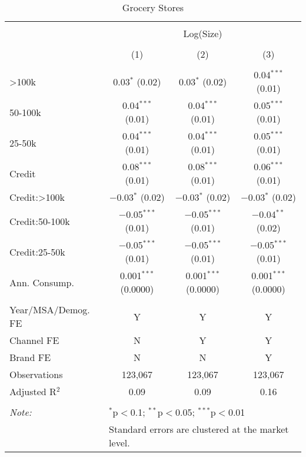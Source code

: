 
\begin{table}[!htbp] \centering 
  \caption{Grocery Stores} 
  \label{tab:packageSizeGroceryDetergent} 
\begin{tabular}{@{\extracolsep{5pt}}lccc} 
\\[-1.8ex]\hline 
\hline \\[-1.8ex] 
 & \multicolumn{3}{c}{Log(Size)} \\ 
\\[-1.8ex] & (1) & (2) & (3)\\ 
\hline \\[-1.8ex] 
 >100k & 0.03$^{*}$ (0.02) & 0.03$^{*}$ (0.02) & 0.04$^{***}$ (0.01) \\ 
  50-100k & 0.04$^{***}$ (0.01) & 0.04$^{***}$ (0.01) & 0.05$^{***}$ (0.01) \\ 
  25-50k & 0.04$^{***}$ (0.01) & 0.04$^{***}$ (0.01) & 0.05$^{***}$ (0.01) \\ 
  Credit & 0.08$^{***}$ (0.01) & 0.08$^{***}$ (0.01) & 0.06$^{***}$ (0.01) \\ 
  Credit:>100k & $-$0.03$^{*}$ (0.02) & $-$0.03$^{*}$ (0.02) & $-$0.03$^{*}$ (0.02) \\ 
  Credit:50-100k & $-$0.05$^{***}$ (0.01) & $-$0.05$^{***}$ (0.01) & $-$0.04$^{**}$ (0.02) \\ 
  Credit:25-50k & $-$0.05$^{***}$ (0.01) & $-$0.05$^{***}$ (0.01) & $-$0.05$^{***}$ (0.01) \\ 
  Ann. Consump. & 0.001$^{***}$ (0.0000) & 0.001$^{***}$ (0.0000) & 0.001$^{***}$ (0.0000) \\ 
 \hline \\[-1.8ex] 
Year/MSA/Demog. FE & Y & Y & Y \\ 
Channel FE & N & Y & Y \\ 
Brand FE & N & N & Y \\ 
Observations & 123,067 & 123,067 & 123,067 \\ 
Adjusted R$^{2}$ & 0.09 & 0.09 & 0.16 \\ 
\hline 
\hline \\[-1.8ex] 
\textit{Note:}  & \multicolumn{3}{l}{$^{*}$p$<$0.1; $^{**}$p$<$0.05; $^{***}$p$<$0.01} \\ 
 & \multicolumn{3}{l}{Standard errors are clustered at the market level.} \\ 
\end{tabular} 
\end{table} 
